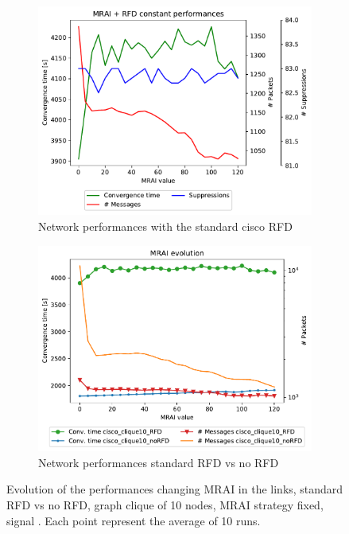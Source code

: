 \begin{figure}[h]
     \centering
     \begin{subfigure}[b]{0.49\textwidth}
         \centering
		 \includegraphics[width=\textwidth]{images/RFD/clique/cisco_clique10_RFD-constant_mrai_rfd_evolution.pdf}
		 \caption{Network performances with the standard cisco \ac{RFD}}
		 \label{fig:clique_evolution_rfd}
     \end{subfigure}
     \hfill
     \begin{subfigure}[b]{0.49\textwidth}
         \centering
         \includegraphics[width=\textwidth]{images/RFD/clique/cisco_clique10_comparison_constant_all.pdf}
		 \caption{Network performances standard \ac{RFD} vs no \ac{RFD}}
         \label{fig:clique_evolution_rfd_vs_noRFd_comparison}
     \end{subfigure}
		\caption{Evolution of the performances changing \ac{MRAI} in the links,
			standard \ac{RFD} vs no \ac{RFD},
			graph clique of \num{10} nodes, \ac{MRAI} strategy fixed, signal .
			Each point represent the average of \num{10} runs.}
        \label{fig:clique_evolution_rfd_vs_noRFD}
\end{figure}

